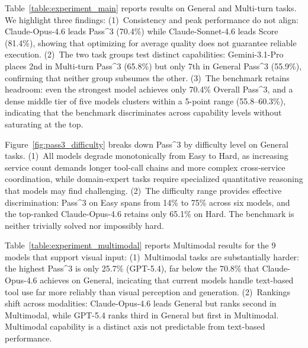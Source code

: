 \documentclass{article}
\begin{document}
Table~\ref{table:experiment_main} reports results on General and Multi-turn tasks. We highlight three findings:
(1)~Consistency and peak performance do not align: Claude-Opus-4.6 leads Pass\textasciicircum{}3 (70.4\%) while Claude-Sonnet-4.6 leads Score (81.4\%), showing that optimizing for average quality does not guarantee reliable execution.
(2)~The two task groups test distinct capabilities: Gemini-3.1-Pro places 2nd in Multi-turn Pass\textasciicircum{}3 (65.8\%) but only 7th in General Pass\textasciicircum{}3 (55.9\%), confirming that neither group subsumes the other.
(3)~The benchmark retains headroom: even the strongest model achieves only 70.4\% Overall Pass\textasciicircum{}3, and a dense middle tier of five models clusters within a 5-point range (55.8--60.3\%), indicating that the benchmark discriminates across capability levels without saturating at the top.

Figure~\ref{fig:pass3_difficulty} breaks down Pass\textasciicircum{}3 by difficulty level on General tasks. 
(1)~All models degrade monotonically from Easy to Hard, as increasing service count demands longer tool-call chains and more complex cross-service coordination, while domain-expert tasks require specialized quantitative reasoning that models may find challenging.
(2)~The difficulty range provides effective discrimination: Pass\textasciicircum{}3 on Easy spans from 14\% to 75\% across six models, and the top-ranked Claude-Opus-4.6 retains only 65.1\% on Hard. The benchmark is neither trivially solved nor impossibly hard.


Table~\ref{table:experiment_multimodal} reports Multimodal results for the 9 models that support visual input:
(1)~Multimodal tasks are substantially harder: the highest Pass\textasciicircum{}3 is only 25.7\% (GPT-5.4), far below the 70.8\% that Claude-Opus-4.6 achieves on General, incicating that current models handle text-based tool use far more reliably than visual perception and generation.
(2)~Rankings shift across modalities: Claude-Opus-4.6 leads General but ranks second in Multimodal, while GPT-5.4 ranks third in General but first in Multimodal. Multimodal capability is a distinct axis not predictable from text-based performance.
\end{document}
